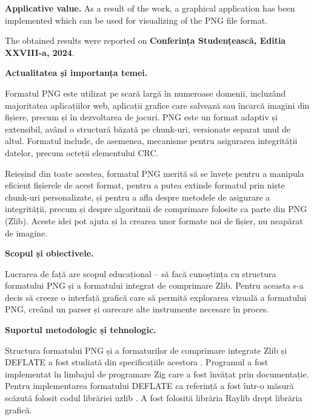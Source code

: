 \documentclass[a4paper,12pt]{report}
\newcommand{\conferencesList}{Conferința Studențească, Editia XXVIII-a, 2024}
\begin{document}
\textbf{Applicative value.} 
As a result of the work, a graphical application has been implemented which can be used for visualizing of the \ac{PNG} file format.

The obtained results were reported on \textbf{\conferencesList}\cite{self}.



\textbf{Actualitatea și importanța temei.}

Formatul \ac{PNG} este utilizat pe scară largă în numeroase domenii, incluzând majoritatea aplicațiilor
web, aplicații grafice care salvează sau încarcă imagini din fișiere, precum și în dezvoltarea de jocuri.
\ac{PNG} este un format adaptiv și extensibil, având o structură băzată pe chunk-uri, versionate separat unul
de altul. Formatul include, de asemenea, mecanisme pentru asigurarea integrității datelor, precum
octeții elementului \ac{CRC}.

Reieșind din toate acestea, formatul \ac{PNG} merită să se învețe pentru a manipula eficient fișierele de
acest format, pentru a putea extinde formatul prin niște chunk-uri personalizate, și pentru a afla despre
metodele de asigurare a integrității, precum și despre algoritmii de comprimare folosite ca parte din \ac{PNG}
(Zlib). Aceste idei pot ajuta și la crearea unor formate noi de fișier, nu neapărat de imagine.

\textbf{Scopul și obiectivele.}

Lucrarea de față are scopul educațional -- să facă cunoștința cu structura formatului \ac{PNG} și a
formatului integrat de comprimare Zlib.
Pentru aceasta s-a decis să creeze o interfață grafică care
să permită explorarea vizuală a formatului \ac{PNG},
creând un parser și oarecare alte instrumente necesare în proces.


\textbf{Suportul metodologic și tehnologic.}

Structura formatului \ac{PNG} și a formaturilor de comprimare integrate Zlib și DEFLATE
a fost studiată din specificațiile acestora \cite{png_spec} \cite{zlib_spec} \cite{deflate_spec}.
Programul a fost implementat în limbajul de programare Zig \cite{zig} care a fost învățat prin documentație.
Pentru implementarea formatului DEFLATE ca referință a fost într-o măsură scăzută folosit codul librăriei uzlib \cite{gzip_impl}.
A fost folosită librăria Raylib \cite{raylib} drept librăria grafică.
\end{document}
